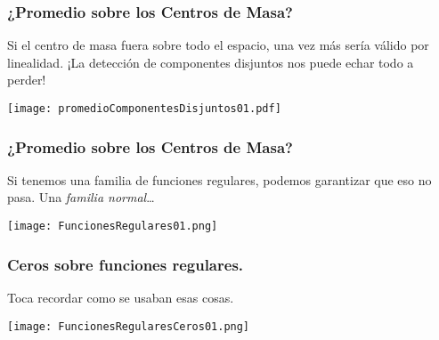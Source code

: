 \documentclass{beamer}
\begin{document}
\begin{frame}
  \frametitle{¿Promedio sobre los Centros de Masa?}
  Si el centro de masa fuera sobre todo el espacio, una
  vez más sería válido por linealidad. ¡La
  detección de componentes disjuntos nos puede echar todo a
  perder!
\begin{center}
 \texttt{[image: promedioComponentesDisjuntos01.pdf]}
\end{center}
\end{frame}


\begin{frame}
  \frametitle{¿Promedio sobre los Centros de Masa?}
  Si tenemos una familia de funciones regulares, podemos garantizar
  que eso no pasa. Una \emph{familia normal}\ldots
\begin{center}
 \texttt{[image: FuncionesRegulares01.png]}
\end{center}
\end{frame}


\begin{frame}
  \frametitle{Ceros sobre funciones regulares.}
  Toca recordar como se usaban esas cosas.
\begin{center}
 \texttt{[image: FuncionesRegularesCeros01.png]}
\end{center}
\end{frame}
\end{document}
